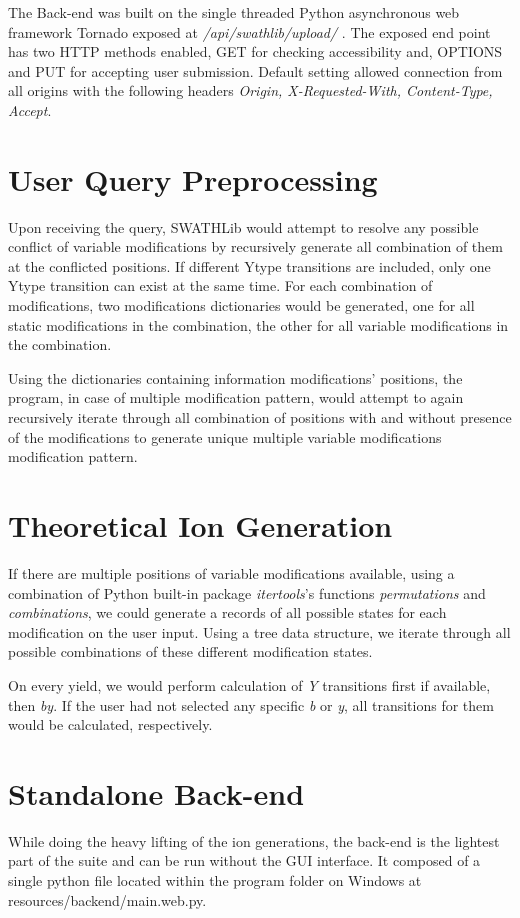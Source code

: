 \documentclass[../manual.tex]{subfiles}
\begin{document}
The Back-end was built on the single threaded Python asynchronous web framework Tornado exposed at \emph{/api/swathlib/upload/} . The exposed end point has two HTTP methods enabled, GET for checking accessibility and, OPTIONS and PUT for accepting user submission. Default setting allowed connection from all origins with the following headers \emph{Origin, X-Requested-With, Content-Type, Accept}.

\section{User Query Preprocessing}
Upon receiving the query, SWATHLib would attempt to resolve any possible conflict of variable modifications by recursively generate all combination of them at the conflicted positions. If different Ytype transitions are included, only one Ytype transition can exist at the same time. For each combination of modifications, two modifications dictionaries would be generated, one for all static modifications in the combination, the other for all variable modifications in the combination.\par

Using the dictionaries containing information modifications' positions, the program, in case of multiple modification pattern, would attempt to again recursively iterate through all combination of positions with and without presence of the modifications to generate unique multiple variable modifications modification pattern.  

\section{Theoretical Ion Generation}
If there are multiple positions of variable modifications available, using a combination of Python built-in package \emph{itertools}'s functions \emph{permutations} and \emph{combinations}, we could generate a records of all possible states for each modification on the user input. Using a tree data structure, we iterate through all possible combinations of these different modification states.\par

On every yield, we would perform calculation of \emph{Y} transitions first if available, then \emph{by}. If the user had not selected any specific \emph{b} or \emph{y}, all transitions for them would be calculated, respectively.

\section{Standalone Back-end}
While doing the heavy lifting of the ion generations, the back-end is the lightest part of the suite and can be run without the GUI interface. It composed of a single python file located within the program folder on Windows at resources/backend/main.web.py.\par
\end{document}
